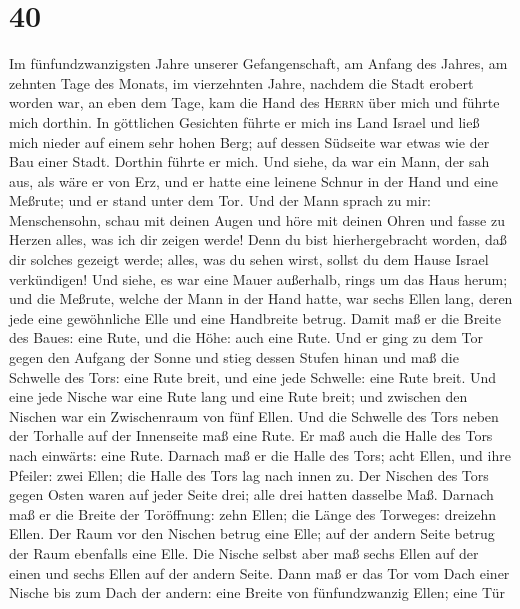 \hypertarget{section-39}{%
\section{40}\label{section-39}}

 Im fünfundzwanzigsten Jahre unserer Gefangenschaft, am
Anfang des Jahres, am zehnten Tage des Monats, im vierzehnten Jahre,
nachdem die Stadt erobert worden war, an eben dem Tage, kam die Hand des
\textsc{Herrn} über mich und führte mich dorthin.  In
göttlichen Gesichten führte er mich ins Land Israel und ließ mich nieder
auf einem sehr hohen Berg; auf dessen Südseite war etwas wie der Bau
einer Stadt. Dorthin führte er mich.  Und siehe, da war
ein Mann, der sah aus, als wäre er von Erz, und er hatte eine leinene
Schnur in der Hand und eine Meßrute; und er stand unter dem Tor.
 Und der Mann sprach zu mir: Menschensohn, schau mit
deinen Augen und höre mit deinen Ohren und fasse zu Herzen alles, was
ich dir zeigen werde! Denn du bist hierhergebracht worden, daß dir
solches gezeigt werde; alles, was du sehen wirst, sollst du dem Hause
Israel verkündigen!  Und siehe, es war eine Mauer
außerhalb, rings um das Haus herum; und die Meßrute, welche der Mann in
der Hand hatte, war sechs Ellen lang, deren jede eine gewöhnliche Elle
und eine Handbreite betrug. Damit maß er die Breite des Baues: eine
Rute, und die Höhe: auch eine Rute.  Und er ging zu dem
Tor gegen den Aufgang der Sonne und stieg dessen Stufen hinan und maß
die Schwelle des Tors: eine Rute breit, und eine jede Schwelle: eine
Rute breit.  Und eine jede Nische war eine Rute lang und
eine Rute breit; und zwischen den Nischen war ein Zwischenraum von fünf
Ellen. Und die Schwelle des Tors neben der Torhalle auf der Innenseite
maß eine Rute.  Er maß auch die Halle des Tors nach
einwärts: eine Rute.  Darnach maß er die Halle des Tors;
acht Ellen, und ihre Pfeiler: zwei Ellen; die Halle des Tors lag nach
innen zu.  Der Nischen des Tors gegen Osten waren auf
jeder Seite drei; alle drei hatten dasselbe Maß.  Darnach
maß er die Breite der Toröffnung: zehn Ellen; die Länge des Torweges:
dreizehn Ellen.  Der Raum vor den Nischen betrug eine
Elle; auf der andern Seite betrug der Raum ebenfalls eine Elle. Die
Nische selbst aber maß sechs Ellen auf der einen und sechs Ellen auf der
andern Seite.  Dann maß er das Tor vom Dach einer Nische
bis zum Dach der andern: eine Breite von fünfundzwanzig Ellen; eine Tür
